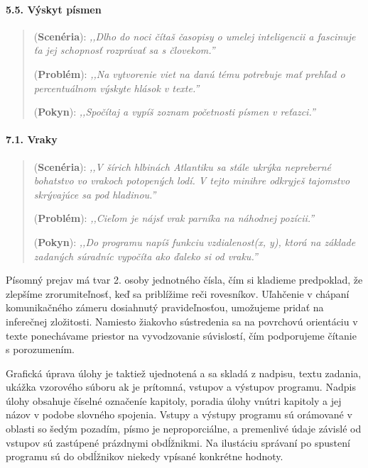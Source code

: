 \paragraph{5.5. Výskyt písmen}
\begin{quote}
(\textbf{Scenéria}): \textit{\small ,,Dlho do noci čítaš časopisy o umelej inteligencii a fascinuje ťa jej schopnosť rozprávať sa s človekom.''} 

(\textbf{Problém}): \textit{\small ,,Na vytvorenie viet na danú tému potrebuje mať prehľad o percentuálnom výskyte hlások v texte.''}

(\textbf{Pokyn}): \textit{\small ,,Spočítaj a vypíš zoznam početnosti písmen v reťazci.''}
\end{quote}

\paragraph{7.1. Vraky}
\begin{quote}
(\textbf{Scenéria}): \textit{\small ,,V šírich hlbinách Atlantiku sa stále ukrýka nepreberné bohatstvo vo vrakoch potopených lodí. V tejto minihre odkryješ tajomstvo skrývajúce sa pod hladinou.''} 

(\textbf{Problém}): \textit{\small ,,Cieľom je nájsť vrak parníka na náhodnej pozícii.''} 

(\textbf{Pokyn}): \textit{\small ,,Do programu napíš funkciu vzdialenost(x, y), ktorá na základe zadaných súradníc vypočíta ako ďaleko si od vraku.''}
\end{quote}

Písomný prejav má tvar 2. osoby jednotného čísla, čím si kladieme predpoklad, že zlepšíme zrorumiteľnosť, keď sa priblížime reči rovesníkov. Uľahčenie v chápaní komunikačného zámeru dosiahnutý pravideľnosťou, umožujeme pridať na inferečnej zložitosti. Namiesto žiakovho sústredenia sa na povrchovú orientáciu v texte ponechávame priestor na vyvodzovanie súvislostí, čím podporujeme čítanie s porozumením. 

Grafická úprava úlohy je taktiež ujednotená a sa skladá z nadpisu, textu zadania, ukážka vzorového súboru ak je prítomná, vstupov a výstupov programu. Nadpis úlohy obsahuje číselné označeníe kapitoly, poradia úlohy vnútri kapitoly a jej názov v podobe slovného spojenia.
Vstupy a výstupy programu sú orámované v oblasti so šedým pozadím, písmo je neproporciálne, a premenlivé údaje závislé od vstupov sú zastúpené prázdnymi obdĺžnikmi. Na ilustáciu správaní po spustení programu sú do obdĺžnikov niekedy vpísané konkrétne hodnoty.

